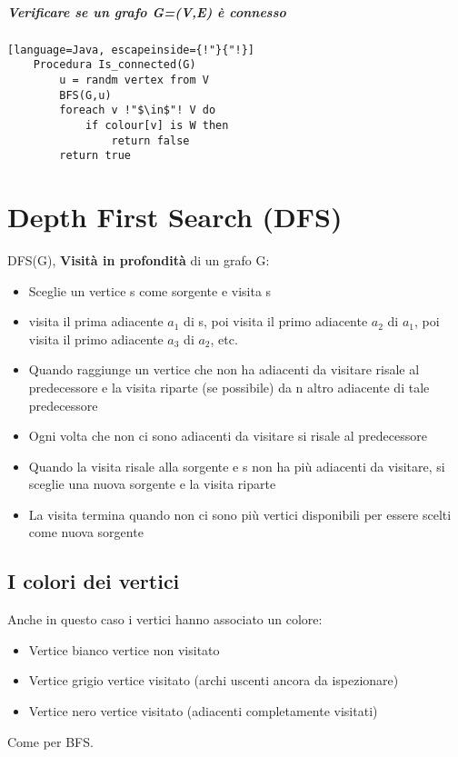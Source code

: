 \paragraph*{Verificare se un grafo G=(V,E) è connesso}
\begin{lstlisting}[language=Java, escapeinside={!"}{"!}]
    Procedura Is_connected(G)
        u = randm vertex from V
        BFS(G,u)
        foreach v !"$\in$"! V do
            if colour[v] is W then
                return false
        return true
\end{lstlisting}

\chapter{Depth First Search (DFS)}
DFS(G), \textbf{Visità in profondità} di un grafo G:
\begin{itemize}
    \item Sceglie un vertice s come sorgente e visita s
    \item visita il prima adiacente $a_1$ di s, poi visita il primo adiacente $a_2$ di $a_1$,
    poi visita il primo adiacente $a_3$ di $a_2$, etc.
    \item Quando raggiunge un vertice che non ha adiacenti da visitare risale al predecessore
    e la visita riparte (se possibile) da n altro adiacente di tale predecessore
    \item Ogni volta che non ci sono adiacenti da visitare si risale al predecessore
    \item Quando la visita risale alla sorgente e s non ha più adiacenti da visitare, si sceglie
    una nuova sorgente e la visita riparte
    \item La visita termina quando non ci sono più vertici disponibili per essere scelti
    come nuova sorgente
\end{itemize}
\section{I colori dei vertici}
Anche in questo caso i vertici hanno associato un colore:
\begin{itemize}
    \item Vertice bianco \ra vertice non visitato
    \item Vertice grigio \ra vertice visitato (archi uscenti ancora da ispezionare)
    \item Vertice nero \ra vertice visitato (adiacenti completamente visitati)
\end{itemize}
Come per BFS.
